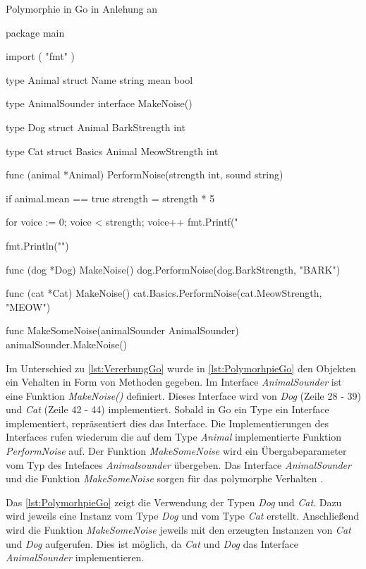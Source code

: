 \begin{listing}[H]
\caption{Polymorphie in Go in Anlehung an \cite[]{WilliamKennedy.2013}}
\label{lst:PolymorhpieGo}
\begin{GoCode}
package main

import (
    "fmt"
)

type Animal struct {
    Name string
    mean bool
}

type AnimalSounder interface {
    MakeNoise()
}

type Dog struct {
    Animal
    BarkStrength int
}

type Cat struct {
    Basics Animal
    MeowStrength int
}

func (animal *Animal) PerformNoise(strength int, sound string) {
    if animal.mean == true {
        strength = strength * 5
    }

    for voice := 0; voice < strength; voice++ {
        fmt.Printf("%
    }

    fmt.Println("")
}

func (dog *Dog) MakeNoise() {
    dog.PerformNoise(dog.BarkStrength, "BARK")
}

func (cat *Cat) MakeNoise() {
    cat.Basics.PerformNoise(cat.MeowStrength, "MEOW")
}

func MakeSomeNoise(animalSounder AnimalSounder) {
    animalSounder.MakeNoise()
}
\end{GoCode}
\end{listing}

Im Unterschied zu \autoref{lst:VererbungGo} wurde in \autoref{lst:PolymorhpieGo} den Objekten ein Vehalten in Form von Methoden gegeben.
Im Interface \emph{AnimalSounder} ist eine Funktion \emph{MakeNoise()} definiert. 
Dieses Interface wird von \emph{Dog} (Zeile 28 - 39) und \emph{Cat} (Zeile 42 - 44) implementiert. 
Sobald in Go ein Type ein Interface implementiert, repräsentiert dies das Interface. 
Die Implementierungen des Interfaces rufen wiederum die auf dem Type \emph{Animal} implementierte Funktion \emph{PerformNoise} auf.
Der Funktion \emph{MakeSomeNoise} wird ein Übergabeparameter vom Typ des Intefaces \emph{Animalsounder} übergeben. 
Das Interface \emph{AnimalSounder} und die Funktion \emph{MakeSomeNoise} sorgen für das polymorphe Verhalten \cite[]{WilliamKennedy.2013}.  

Das \autoref{lst:PolymorhpieGo} zeigt die Verwendung der Typen \emph{Dog} und \emph{Cat}.
Dazu wird jeweils eine Instanz vom Type \emph{Dog} und vom Type \emph{Cat} erstellt. 
Anschließend wird die Funktion \emph{MakeSomeNoise} jeweils mit den erzeugten Instanzen von \emph{Cat} und \emph{Dog} aufgerufen. 
Dies ist möglich, da \emph{Cat} und \emph{Dog} das Interface \emph{AnimalSounder} implementieren. 

